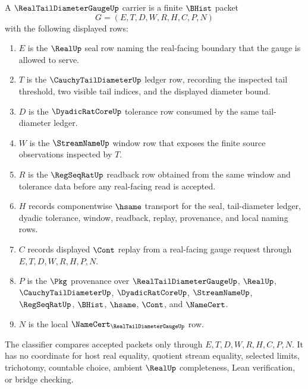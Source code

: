 \begin{definition}
\label{def:real-tail-diameter-gauge-bhist-source}
A $\RealTailDiameterGaugeUp$ carrier is a finite $\BHist$ packet
$$
G=(E,T,D,W,R,H,C,P,N)
$$
with the following displayed rows:
\begin{enumerate}
\item $E$ is the $\RealUp$ seal row naming the real-facing boundary that the gauge is allowed to serve.
\item $T$ is the $\CauchyTailDiameterUp$ ledger row, recording the inspected tail threshold, two visible tail indices, and the displayed diameter bound.
\item $D$ is the $\DyadicRatCoreUp$ tolerance row consumed by the same tail-diameter ledger.
\item $W$ is the $\StreamNameUp$ window row that exposes the finite source observations inspected by $T$.
\item $R$ is the $\RegSeqRatUp$ readback row obtained from the same window and tolerance data before any real-facing read is accepted.
\item $H$ records componentwise $\hsame$ transport for the seal, tail-diameter ledger, dyadic tolerance, window, readback, replay, provenance, and local naming rows.
\item $C$ records displayed $\Cont$ replay from a real-facing gauge request through $E,T,D,W,R,H,P,N$.
\item $P$ is the $\Pkg$ provenance over $\RealTailDiameterGaugeUp$, $\RealUp$, $\CauchyTailDiameterUp$, $\DyadicRatCoreUp$, $\StreamNameUp$, $\RegSeqRatUp$, $\BHist$, $\hsame$, $\Cont$, and $\NameCert$.
\item $N$ is the local $\NameCert_{\RealTailDiameterGaugeUp}$ row.
\end{enumerate}
The classifier compares accepted packets only through $E,T,D,W,R,H,C,P,N$. It has no coordinate for host real equality, quotient stream equality, selected limits, trichotomy, countable choice, ambient $\RealUp$ completeness, Lean verification, or bridge checking.
\end{definition}

